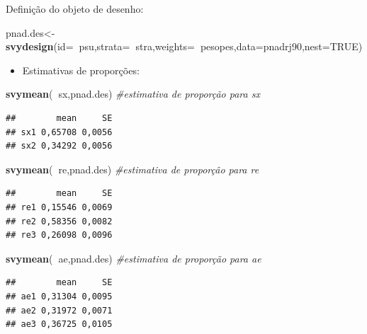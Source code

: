 \documentclass[]{book}
\newenvironment{Shaded}{\begin{snugshade}}{\end{snugshade}}
\newcommand{\KeywordTok}[1]{\textcolor[rgb]{0.13,0.29,0.53}{\textbf{#1}}}
\newcommand{\DataTypeTok}[1]{\textcolor[rgb]{0.13,0.29,0.53}{#1}}
\newcommand{\CommentTok}[1]{\textcolor[rgb]{0.56,0.35,0.01}{\textit{#1}}}
\newcommand{\OtherTok}[1]{\textcolor[rgb]{0.56,0.35,0.01}{#1}}
\newcommand{\OperatorTok}[1]{\textcolor[rgb]{0.81,0.36,0.00}{\textbf{#1}}}
\newcommand{\NormalTok}[1]{#1}
\providecommand{\tightlist}{%
  \setlength{\itemsep}{0pt}\setlength{\parskip}{0pt}}
\theoremstyle{definition}
\theoremstyle{definition}
\theoremstyle{definition}
\theoremstyle{remark}
\begin{document}
Definição do objeto de desenho:

\begin{Shaded}
\begin{Highlighting}[]
\NormalTok{pnad.des<-}\KeywordTok{svydesign}\NormalTok{(}\DataTypeTok{id=}\OperatorTok{~}\NormalTok{psu,}\DataTypeTok{strata=}\OperatorTok{~}\NormalTok{stra,}\DataTypeTok{weights=}\OperatorTok{~}\NormalTok{pesopes,}\DataTypeTok{data=}\NormalTok{pnadrj90,}\DataTypeTok{nest=}\OtherTok{TRUE}\NormalTok{)}
\end{Highlighting}
\end{Shaded}

\begin{itemize}
\tightlist
\item
  Estimativas de proporções:
\end{itemize}

\begin{Shaded}
\begin{Highlighting}[]
\KeywordTok{svymean}\NormalTok{(}\OperatorTok{~}\NormalTok{sx,pnad.des)         }\CommentTok{#estimativa de proporção para sx}
\end{Highlighting}
\end{Shaded}

\begin{verbatim}
##        mean     SE
## sx1 0,65708 0,0056
## sx2 0,34292 0,0056
\end{verbatim}

\begin{Shaded}
\begin{Highlighting}[]
\KeywordTok{svymean}\NormalTok{(}\OperatorTok{~}\NormalTok{re,pnad.des)         }\CommentTok{#estimativa de proporçâo para re}
\end{Highlighting}
\end{Shaded}

\begin{verbatim}
##        mean     SE
## re1 0,15546 0,0069
## re2 0,58356 0,0082
## re3 0,26098 0,0096
\end{verbatim}

\begin{Shaded}
\begin{Highlighting}[]
\KeywordTok{svymean}\NormalTok{(}\OperatorTok{~}\NormalTok{ae,pnad.des)         }\CommentTok{#estimativa de proporção para ae}
\end{Highlighting}
\end{Shaded}

\begin{verbatim}
##        mean     SE
## ae1 0,31304 0,0095
## ae2 0,31972 0,0071
## ae3 0,36725 0,0105
\end{verbatim}
\end{document}
